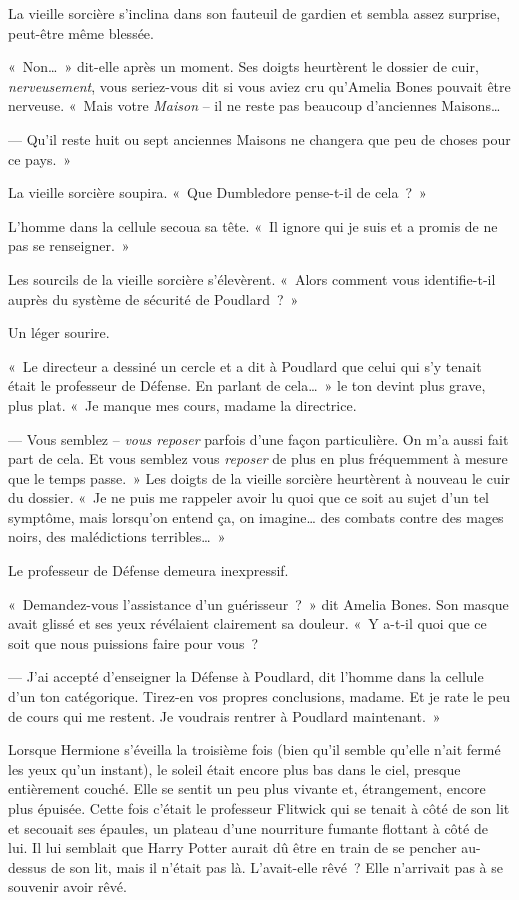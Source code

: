 La vieille sorcière s'inclina dans son fauteuil de gardien et sembla assez surprise, peut-être même blessée.

«~Non…~» dit-elle après un moment. Ses doigts heurtèrent le dossier de cuir, \emph{nerveusement}, vous seriez-vous dit si vous aviez cru qu'Amelia Bones pouvait être nerveuse. «~Mais votre \emph{Maison} -- il ne reste pas beaucoup d'anciennes Maisons…

--- Qu'il reste huit ou sept anciennes Maisons ne changera que peu de choses pour ce pays.~»

La vieille sorcière soupira. «~Que Dumbledore pense-t-il de cela~?~»

L'homme dans la cellule secoua sa tête. «~Il ignore qui je suis et a promis de ne pas se renseigner.~»

Les sourcils de la vieille sorcière s'élevèrent. «~Alors comment vous identifie-t-il auprès du système de sécurité de Poudlard~?~»

Un léger sourire.

«~Le directeur a dessiné un cercle et a dit à Poudlard que celui qui s'y tenait était le professeur de Défense. En parlant de cela…~» le ton devint plus grave, plus plat. «~Je manque mes cours, madame la directrice.

--- Vous semblez -- \emph{vous reposer} parfois d'une façon particulière. On m'a aussi fait part de cela. Et vous semblez vous \emph{reposer} de plus en plus fréquemment à mesure que le temps passe.~» Les doigts de la vieille sorcière heurtèrent à nouveau le cuir du dossier. «~Je ne puis me rappeler avoir lu quoi que ce soit au sujet d'un tel symptôme, mais lorsqu'on entend ça, on imagine… des combats contre des mages noirs, des malédictions terribles…~»

Le professeur de Défense demeura inexpressif.

«~Demandez-vous l'assistance d'un guérisseur~?~» dit Amelia Bones. Son masque avait glissé et ses yeux révélaient clairement sa douleur. «~Y a-t-il quoi que ce soit que nous puissions faire pour vous~?

--- J'ai accepté d'enseigner la Défense à Poudlard, dit l'homme dans la cellule d'un ton catégorique. Tirez-en vos propres conclusions, madame. Et je rate le peu de cours qui me restent. Je voudrais rentrer à Poudlard maintenant.~»

\later

Lorsque Hermione s'éveilla la troisième fois (bien qu'il semble qu'elle n'ait fermé les yeux qu'un instant), le soleil était encore plus bas dans le ciel, presque entièrement couché. Elle se sentit un peu plus vivante et, étrangement, encore plus épuisée. Cette fois c'était le professeur Flitwick qui se tenait à côté de son lit et secouait ses épaules, un plateau d'une nourriture fumante flottant à côté de lui. Il lui semblait que Harry Potter aurait dû être en train de se pencher au-dessus de son lit, mais il n'était pas là. L'avait-elle rêvé~? Elle n'arrivait pas à se souvenir avoir rêvé.

